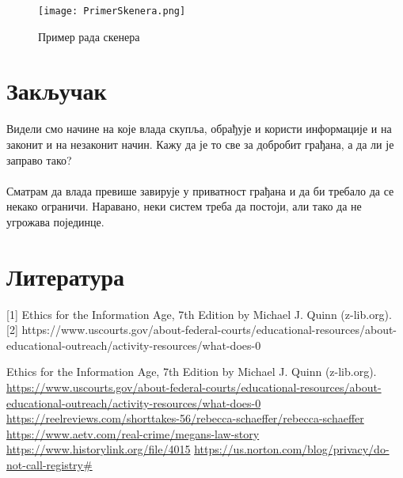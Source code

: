 \documentclass{article}
\begin{document}
\begin{figure}[h!]
\centering
\texttt{[image: PrimerSkenera.png]}
\caption{\label{fig:sangaj}Пример рада скенера}
\end{figure} 

\section{Закључак}
Видели смо начине на које влада скупља, обрађује и користи информације и на законит и на незаконит начин. Кажу да је то све за добробит грађана, а да ли је заправо тако?
\\\\
Сматрам да влада превише завирује у приватност грађана и да би требало да се некако ограничи. Наравано, неки систем треба да постоји, али тако да не угрожава појединце.

\newpage
\section{Литература}

 
[1] Ethics for the Information Age, 7th Edition by Michael J. Quinn (z-lib.org). 
[2] https://www.uscourts.gov/about-federal-courts/educational-resources/about-educational-outreach/activity-resources/what-does-0

\begin{thebibliography}{9}
			
			Ethics for the Information Age, 7th Edition by Michael J. Quinn (z-lib.org). 
			\href{https://www.uscourts.gov/about-federal-courts/educational-resources/about-educational-outreach/activity-resources/what-does-0}{https://www.uscourts.gov/about-federal-courts/educational-resources/about-educational-outreach/activity-resources/what-does-0}
			\href {https://reelreviews.com/shorttakes-56/rebecca-schaeffer/rebecca-schaeffer}{https://reelreviews.com/shorttakes-56/rebecca-schaeffer/rebecca-schaeffer}
			\href {https://www.aetv.com/real-crime/megans-law-story}{https://www.aetv.com/real-crime/megans-law-story}
			\href {https://www.historylink.org/file/4015}{https://www.historylink.org/file/4015}
			\href {https://us.norton.com/blog/privacy/do-not-call-registry#}{https://us.norton.com/blog/privacy/do-not-call-registry#}
			
		\end{thebibliography}
\end{document}
